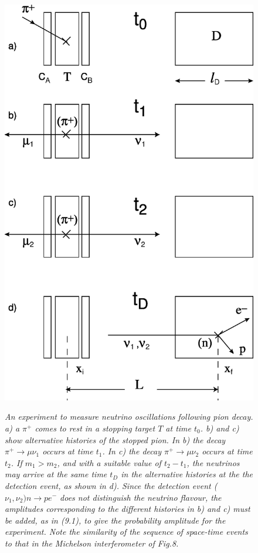 \documentclass [12pt]{article}
\begin{document}
{\begin{figure}[htbp]
\begin{center}
\hspace*{-0.5cm}\mbox{
\includegraphics[width=5.5in]{poptf11c.eps}}
\caption{{\sl An experiment to measure neutrino oscillations
  following pion decay. a) a $\pi^+$ comes to rest in a stopping target $T$ at time
  $t_0$.  b) and c) show alternative histories of the stopped pion. In b) the decay $\pi^+ \rightarrow
  \mu \nu_1$ occurs at time $t_1$. In c) the decay $\pi^+ \rightarrow
  \mu \nu_2$ occurs at time $t_2$. If $m_1 > m_2$, and with a suitable value of $t_2-t_1$, the 
    neutrinos may arrive at the same time $t_D$ in the alternative histories
  at the the detection event, as shown in d). Since the detection event ($\nu_1,\nu_2)n \rightarrow p e^-$
  does not distinguish the neutrino flavour, the amplitudes corresponding to the different histories
  in b) and c) must be added, as in (9.1), to give the probability amplitude for the experiment. 
  Note the similarity of the sequence of space-time events to that in the Michelson interferometer of
  Fig.8. }} 
\label{fig-fig11}
\end{center}
\end{figure}

}
\end{document}
